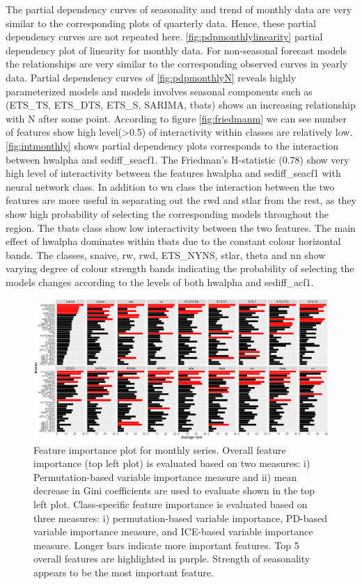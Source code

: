 \documentclass[11pt,a4paper,]{article}
\begin{document}
The partial dependency curves of seasonality and trend of monthly data are very similar to the corresponding plots of quarterly data. Hence, these partial dependency curves are not repeated here. \autoref{fig:pdpmonthlylinearity} partial dependency plot of linearity for monthly data. For non-seasonal forecast models the relationships are very similar to the corresponding observed curves in yearly data. Partial dependency curves of \autoref{fig:pdpmonthlyN} reveals highly parameterized models and models involves seasonal components such as (ETS\_TS, ETS\_DTS, ETS\_S, SARIMA, tbats) shows an increasing relationship with N after some point. According to figure \autoref{fig:friedmanm} we can see number of features show high level(\textgreater{}0.5) of interactivity within classes are relatively low. \autoref{fig:intmonthly} shows partial dependency plots corresponds to the interaction between hwalpha and sediff\_seacf1. The Friedman's H-statistic (0.78) show very high level of interactivity between the features hwalpha and sediff\_seacf1 with neural network class. In addition to wn class the interaction between the two features are more useful in separating out the rwd and stlar from the rest, as they show high probability of selecting the corresponding models throughout the region. The tbats class show low interactivity between the two features. The main effect of hwalpha dominates within tbats due to the constant colour horizontal bands. The classes, snaive, rw, rwd, ETS\_NYNS, stlar, theta and nn show varying degree of colour strength bands indicating the probability of selecting the models changes according to the levels of both hwalpha and sediff\_acf1.

\begin{figure}
\centering
\includegraphics{figures/vimonthly-1.pdf}
\caption{\label{fig:vimonthly}Feature importance plot for monthly series. Overall feature importance (top left plot) is evaluated based on two measures: i) Permutation-based variable importance measure and ii) mean decrease in Gini coefficients are used to evaluate shown in the top left plot. Class-specific feature importance is evaluated based on three measures: i) permutation-based variable importance, PD-based variable importance measure, and ICE-based variable importance measure. Longer bars indicate more important features. Top 5 overall features are highlighted in purple. Strength of seasonality appears to be the most important feature.}
\end{figure}
\end{document}
